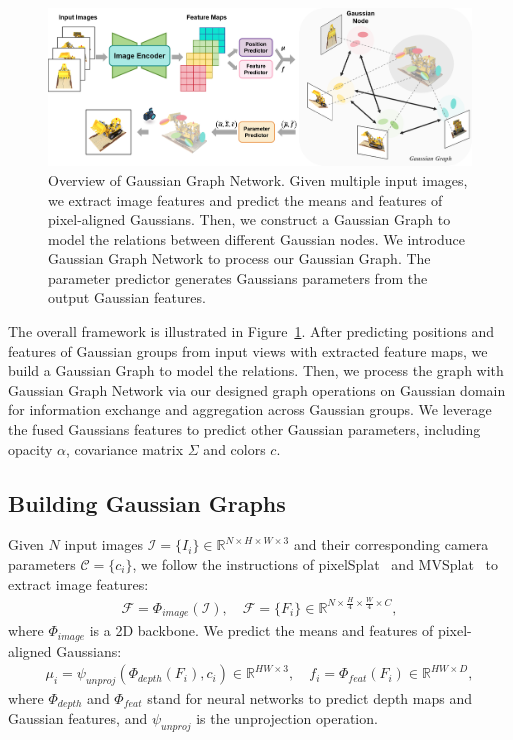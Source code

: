 \begin{figure}
    \centering
    \includegraphics[width=\linewidth]{fig/pipeline.png}
    \caption{Overview of Gaussian Graph Network. Given multiple input images, we extract image features and predict the means and features of pixel-aligned Gaussians. Then, we construct a Gaussian Graph to model the relations between different Gaussian nodes. We introduce Gaussian Graph Network to process our Gaussian Graph. The parameter predictor generates Gaussians parameters from the output Gaussian features. }
    \label{fig:pipeline}
    \vspace{-0.3cm}
\end{figure}
The overall framework is illustrated in Figure~\ref{fig:pipeline}. After predicting positions and features of Gaussian groups from input views with extracted feature maps, we build a Gaussian Graph to model the relations. Then, we process the graph with Gaussian Graph Network via our designed graph operations on Gaussian domain for information exchange and aggregation across Gaussian groups. We leverage the fused Gaussians features to predict other Gaussian parameters, including opacity $\alpha$, covariance matrix $\Sigma$ and colors $c$.

\subsection{Building Gaussian Graphs}

Given $N$ input images $\mathcal{I}=\{I_{i}\}\in\mathbb{R}^{N\times H\times W\times 3}$ and their corresponding camera parameters $\mathcal{C}=\{c_{i}\}$, 
we follow the instructions of pixelSplat~\cite{pixelSplat2023arXiv} and MVSplat~\cite{MVSplat2024arXiv} to extract image features:
\begin{align}
    \mathcal{F}=\Phi_{image}(\mathcal{I}), \quad \mathcal{F}=\{F_{i}\}\in\mathbb{R}^{N\times \frac{H}{4}\times \frac{W}{4}\times C},
\end{align}
where $\Phi_{image}$ is a 2D backbone.
We predict the means and features of pixel-aligned Gaussians:
\begin{align}
    \mu_{i}=\psi_{unproj}\left(\Phi_{depth}(F_{i}), c_{i}\right)\in\mathbb{R}^{HW\times 3}, \quad
    f_{i}=\Phi_{feat}(F_{i})\in\mathbb{R}^{HW\times D}, \label{eq:depth estimation}
\end{align}
where $\Phi_{depth}$ and $\Phi_{feat}$ stand for neural networks to predict depth maps and Gaussian features, and $\psi_{unproj}$ is the unprojection operation.

